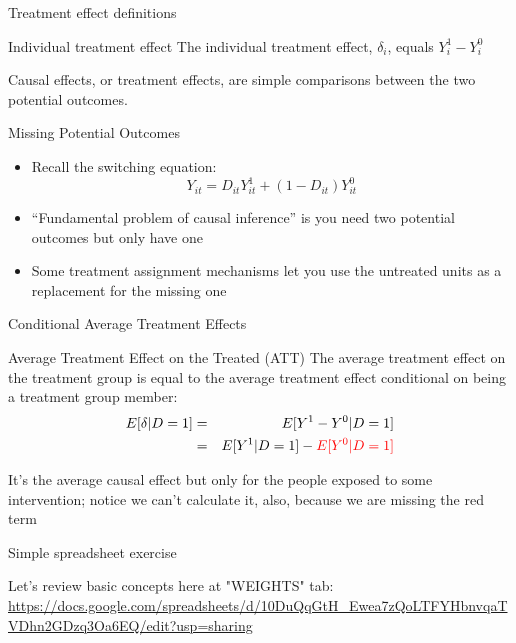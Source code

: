 \documentclass{beamer}
\begin{document}
\begin{frame}{Treatment effect definitions}


	\begin{block}{Individual treatment effect}
	    The individual treatment effect,  $\delta_i$, equals $Y_i^1-Y_i^0$
	\end{block}
	
	Causal effects, or treatment effects, are simple comparisons between the two potential outcomes. 
	

	
\end{frame}

\begin{frame}{Missing Potential Outcomes}

\begin{itemize}
\item Recall the switching equation:  $$Y_{it}=D_{it}Y_{it}^1 + (1-D_{it})Y_{it}^0$$ 
\item ``Fundamental problem of causal inference'' is you need two potential outcomes but only have one
\item Some treatment assignment mechanisms let you use the untreated units as a replacement for the missing one
\end{itemize}

\end{frame}


\begin{frame}{Conditional Average Treatment Effects}	
	\begin{block}{Average Treatment Effect on the Treated (ATT)}
	The average treatment effect on the treatment group is equal to the average treatment effect conditional on being a treatment group member:
		\begin{eqnarray*}
		E[\delta|D=1]&=&E[Y^1-Y^0|D=1] \nonumber \\
		&=&E[Y^1|D=1]-\textcolor{red}{E[Y^0|D=1]}
		\end{eqnarray*}
	\end{block}
	
	\bigskip

It's the average causal effect but only for the people exposed to some intervention; notice we can't calculate it, also, because we are missing the red term

	
\end{frame}

\begin{frame}{Simple spreadsheet exercise}

Let's review basic concepts here at "WEIGHTS" tab: \url{https://docs.google.com/spreadsheets/d/10DuQqGtH_Ewea7zQoLTFYHbnvqaTVDhn2GDzq3Oa6EQ/edit?usp=sharing}

\end{frame}
\end{document}

